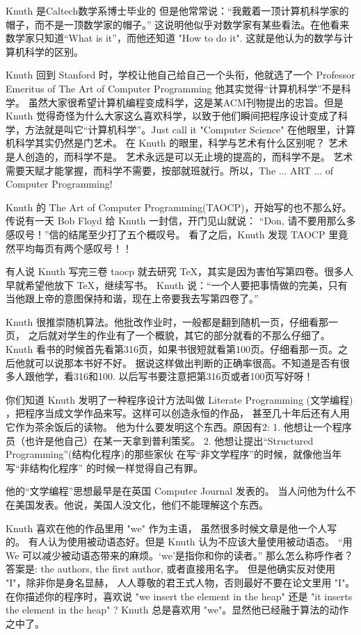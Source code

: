 Knuth 是Caltech数学系博士毕业的 但是他常常说：“我戴着一顶计算机科学家的帽子，而不是一顶数学家的帽子。” 这说明他似乎对数学家有某些看法。在他看来数学家只知道“What is it”，而他还知道 "How to do it". 这就是他认为的数学与计算机科学的区别。

Knuth 回到 Stanford 时，学校让他自己给自己一个头衔，他就选了一个 Professor Emeritus of The Art of Computer Programming 他其实觉得“计算机科学”不是科学。 虽然大家很希望计算机编程变成科学，这是某ACM刊物提出的忠旨。但是 Knuth 觉得奇怪为什么大家这么喜欢科学，以致于他们瞬间把程序设计变成了科学，方法就是叫它“计算机科学”。Just call it "Computer Science" 在他眼里，计算机科学其实仍然是门艺术。 在 Knuth 的眼里，科学与艺术有什么区别呢？ 艺术是人创造的，而科学不是。 艺术永远是可以无止境的提高的，而科学不是。 艺术需要天赋才能掌握，而科学不需要，按部就班就行。所以，The ... ART ... of Computer Programming! 



Knuth 的 The Art of Computer Programming(TAOCP)，开始写的也不那么好。 传说有一天 Bob Floyd 给 Knuth 一封信，开门见山就说： “Don, 请不要用那么多感叹号！”信的结尾至少打了五个概叹号。 看了之后，Knuth 发现 TAOCP 里竟然平均每页有两个感叹号！！ 

有人说 Knuth 写完三卷 taocp 就去研究 TeX，其实是因为害怕写第四卷。很多人早就希望他放下 TeX，继续写书。 Knuth 说：“一个人要把事情做的完美，只有当他跟上帝的意图保持和谐，现在上帝要我去写第四卷了。” 

Knuth 很推崇随机算法。他批改作业时，一般都是翻到随机一页，仔细看那一页， 之后就对学生的作业有了一个概貌，其它的部分就看的不那么仔细了。Knuth 看书的时候首先看第316页，如果书很短就看第100页。仔细看那一页。之后他就可以说那本书好不好。 据说这样做出判断的正确率很高。不知道是否有很多人跟他学，看316和100. 以后写书要注意把第316页或者100页写好呀！ 

你们知道 Knuth 发明了一种程序设计方法叫做 Literate Programming (文学编程) ，把程序当成文学作品来写。这样可以创造永恒的作品， 甚至几十年后还有人用它作为茶余饭后的读物。 他为什么要发明这个东西。原因有2: 1. 他想让一个程序员（也许是他自己）在某一天拿到普利策奖。 2. 他想让提出“Structured Programming”(结构化程序)的那些家伙 在写“非文学程序”的时候，就像他当年写“非结构化程序” 的时候一样觉得自己有罪。 



他的“文学编程”思想最早是在英国 Computer Journal 发表的。 当人问他为什么不在美国发表。他说，美国人没文化，他们不能理解这个东西。 






Knuth 喜欢在他的作品里用 "we" 作为主语， 虽然很多时候文章是他一个人写的。 有人认为使用被动语态好。但是 Knuth 认为不应该大量使用被动语态。 “用 We 可以减少被动语态带来的麻烦。‘we’是指你和你的读者。” 那么怎么称呼作者？答案是: the authors, the first author, 或者直接用名字。 但是他确实反对使用 "I"，除非你是身名显赫， 人人尊敬的君王式人物，否则最好不要在论文里用 "I"。 在你描述你的程序时，喜欢说 "we insert the element in the heap" 还是 "it inserts the element in the heap" ? Knuth 总是喜欢用 "we"。显然他已经融于算法的动作之中了。 


